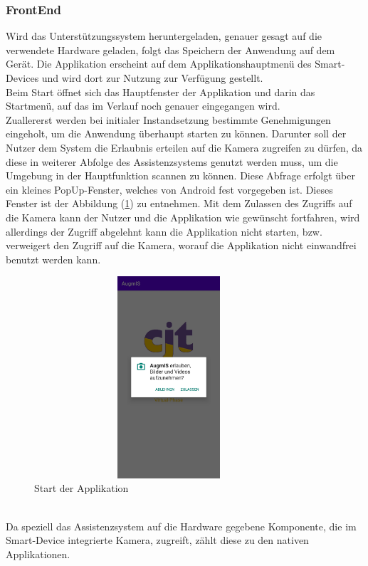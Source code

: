 \subsubsection{FrontEnd}
Wird das Unterstützungssystem heruntergeladen, genauer gesagt auf die verwendete Hardware geladen, folgt das Speichern der Anwendung auf dem Gerät. Die Applikation 
erscheint auf dem Applikationshauptmenü des Smart-Devices und wird dort zur Nutzung zur Verfügung gestellt. 
\\ 
Beim Start öffnet sich das Hauptfenster der Applikation und darin das Startmenü, auf das im Verlauf noch genauer eingegangen wird. 
\\ 
Zuallererst werden bei initialer Instandsetzung bestimmte Genehmigungen eingeholt, um die Anwendung überhaupt starten zu können. Darunter soll der Nutzer dem System 
die Erlaubnis erteilen auf die Kamera zugreifen zu dürfen, da diese in weiterer Abfolge des Assistenzsystems genutzt werden muss, um die Umgebung in der Hauptfunktion 
scannen zu können. Diese Abfrage erfolgt über ein kleines PopUp-Fenster, welches von Android fest vorgegeben ist. Dieses Fenster ist der Abbildung (\ref{pic:camera_perm}) 
zu entnehmen. Mit dem Zulassen des Zugriffs auf die Kamera kann der Nutzer und die Applikation wie gewünscht fortfahren, wird allerdings der Zugriff abgelehnt kann 
die Applikation nicht starten, bzw. verweigert den Zugriff auf die Kamera, worauf die Applikation nicht einwandfrei benutzt werden kann.     
\begin{figure}[hbt!]
    \centering
    \includegraphics[width=10cm,height=7.5cm,keepaspectratio]{4Umsetzung/Bilder/camera_permission.jpg}
    \caption{Start der Applikation}
    \label{pic:camera_perm}
\end{figure}
\pagebreak
\\ 
Da speziell das Assistenzsystem auf die Hardware gegebene Komponente, die im Smart-Device integrierte Kamera, zugreift, zählt diese zu den nativen Applikationen. 
